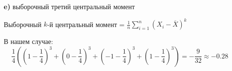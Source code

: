 \documentclass{article}
\begin{document}
\begin{itemize}
    \item[\textbf{e)}] выборочный третий центральный момент
    
    Выборочный $k$-й центральный момент = $\displaystyle\frac{1}{n}\sum_{i=1}^n\left(X_i-\overline{X}\right)^k$

    В нашем случае:
    \begin{equation*}
        \frac{1}{4}\left(\left(1-\frac{1}{4}\right)^3+\left(0-\frac{1}{4}\right)^3+\left(-1-\frac{1}{4}\right)^3+\left(1-\frac{1}{4}\right)^3\right)=-\frac{9}{32}\approx-0.28
    \end{equation*}
\end{itemize}
\end{document}
